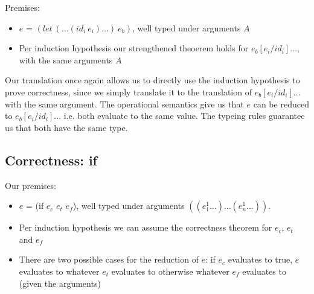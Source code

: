 \documentclass[letterpaper,12pt]{article}
\begin{document}
Premises:
\begin{itemize}
	\item $e$ = $(let\: (\dots(id_i\: e_i)\dots)\: e_b)$, well typed
		under arguments $A$
	\item Per induction hypothesis our strengthened theoerem
		holds for $e_b[e_i / id_i]\dots$, with the same arguments $A$
\end{itemize}

Our translation once again allows us to directly use the induction
hypothesis to prove correctness, since we simply translate it to
the translation of $e_b[e_i / id_i]\dots$ with the same argument.
The operational semantics give us that $e$ can be reduced to
$e_b[e_i / id_i]\dots$ i.e. both evaluate to the same value.
The typeing rules guarantee us that both have the same type.

% 

\subsection{Correctness: if}

Our premises:
\begin{itemize}
	\item $e$ = (if $e_c$ $e_t$ $e_f$), well typed under arguments
		$((e_1^1\dots)\dots(e_n^1\dots))$.
	\item Per induction hypothesis we can assume the correctness
		theorem for $e_c$, $e_t$ and $e_f$
	\item There are two possible cases for the reduction of $e$:
		if $e_c$ evaluates to true, $e$ evaluates to whatever
		$e_t$ evaluates to otherwise whatever $e_f$ evaluates to
		(given the arguments)
\end{itemize}
\end{document}

